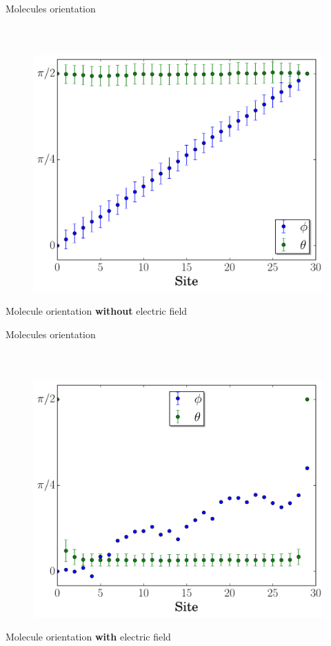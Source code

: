 \documentclass{beamer}
\begin{document}
\begin{frame}{Molecules orientation}
\framesubtitle{\ }
    \begin{figure}[h!]
    \includegraphics[scale=0.45]{figures/lcd_allume_T01.pdf}
    \end{figure}

\center
Molecule orientation \textbf{without} electric field
\end{frame}

\begin{frame}{Molecules orientation}
\framesubtitle{\ }
    \begin{figure}[h!]
    \includegraphics[scale=0.45]{figures/lcd_etteind.pdf}
    \end{figure}
\center
Molecule orientation \textbf{with} electric field
\end{frame}
\end{document}
